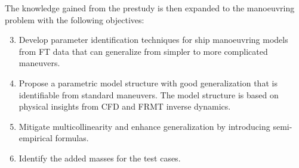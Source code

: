 \vspace{0.1 cm}
\noindent The knowledge gained from the prestudy is then expanded to the manoeuvring problem with the following objectives: 
\begin{enumerate}[label=(\Alph*),itemsep=1mm]
    \setcounter{enumi}{2}

    \item Develop parameter identification techniques for ship manoeuvring models from FT data that can generalize from simpler to more complicated maneuvers.

    \item Propose a parametric model structure with good generalization that is identifiable from standard maneuvers. The model structure is based on physical insights from CFD and FRMT inverse dynamics.

    \item Mitigate multicollinearity and enhance generalization by introducing semi-empirical formulas.

    \item Identify the added masses for the test cases.    
\end{enumerate}
